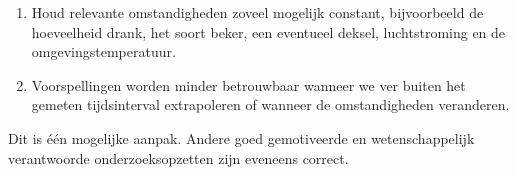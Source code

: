 \documentclass{ximera}
\begin{document}
\begin{oefening}{\oefG}
\begin{oplossing}
\begin{enumerate}
  \item Houd relevante omstandigheden zoveel mogelijk constant,
        bijvoorbeeld de hoeveelheid drank, het soort beker, een
        eventueel deksel, luchtstroming en de omgevingstemperatuur.

  \item Voorspellingen worden minder betrouwbaar wanneer we ver buiten
        het gemeten tijdsinterval extrapoleren of wanneer de
        omstandigheden veranderen.
\end{enumerate}

Dit is één mogelijke aanpak. Andere goed gemotiveerde en
wetenschappelijk verantwoorde onderzoeksopzetten zijn eveneens correct.
\end{oplossing}

\end{oefening}
\end{document}
